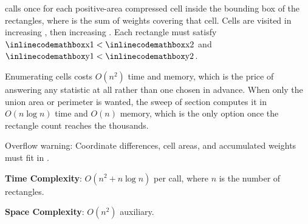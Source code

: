 \begin{compactitem}
  \item {} calls  once for each positive-area compressed cell inside the bounding box of the rectangles, where  is the sum of weights covering that cell. Cells are visited in increasing , then increasing . Each rectangle must satisfy ${\inlinecodemath{x1}} < {\inlinecodemath{x2}}$ and ${\inlinecodemath{y1}} < {\inlinecodemath{y2}}$.
\end{compactitem}

Enumerating cells costs $O(n^{2})$ time and memory, which is the price of answering any statistic at all rather than one chosen in advance. When only the union area or perimeter is wanted, the sweep of section  computes it in $O(n \log n)$ time and $O(n)$ memory, which is the only option once the rectangle count reaches the thousands.

Overflow warning: Coordinate differences, cell areas, and accumulated weights must fit in .

\textbf{Time Complexity}: $O(n^{2} + n \log n)$ per call, where $n$ is the number of rectangles.

\textbf{Space Complexity}: $O(n^{2})$ auxiliary.

